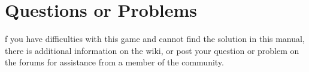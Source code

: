 \documentclass[openany]{book}
\begin{document}
\section*{Questions or Problems}

f you have difficulties with this game and cannot find the solution in this manual, there is additional information on the wiki, or post your question or problem on the forums for assistance from a member of the community.

\clearpage
{}
\tableofcontents

\mainmatter























\backmatter

\cleardoublepage
{}
\printindex
\end{document}
